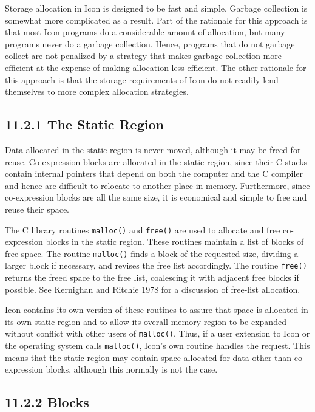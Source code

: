 Storage allocation in Icon is designed to be fast and simple. Garbage
collection is somewhat more complicated as a result. Part of the
rationale for this approach is that most Icon programs do a
considerable amount of allocation, but many programs never do a
garbage collection. Hence, programs that do not garbage collect are
not penalized by a strategy that makes garbage collection more
efficient at the expense of making allocation less efficient. The
other rationale for this approach is that the storage requirements of
Icon do not readily lend themselves to more complex allocation
strategies.

\subsection[11.2.1 The Static Region]{11.2.1 The Static Region}

Data allocated in the static region is never moved, although it may be
freed for reuse. Co-expression blocks are allocated in the static
region, since their C stacks contain internal pointers that depend on
both the computer and the C compiler and hence are difficult to
relocate to another place in memory. Furthermore, since co-expression
blocks are all the same size, it is economical and simple to free and
reuse their space.

The C library routines \texttt{malloc()} and \texttt{free()} are used
to allocate and free co-expression blocks in the static region. These
routines maintain a list of blocks of free space. The routine
\texttt{malloc()} finds a block of the requested size, dividing a
larger block if necessary, and revises the free list accordingly. The
routine \texttt{free()} returns the freed space to the free list,
coalescing it with adjacent free blocks if possible. See Kernighan and
Ritchie 1978 for a discussion of free-list allocation.

Icon contains its own version of these routines to assure that space
is allocated in its own static region and to allow its overall memory
region to be expanded without conflict with other users of
\texttt{malloc()}. Thus, if a user extension to Icon or the operating
system calls \texttt{malloc()}, Icon's own routine handles the
request. This means that the static region may contain space allocated
for data other than co-expression blocks, although this normally is
not the case.

\subsection[11.2.2 Blocks]{11.2.2 Blocks}

